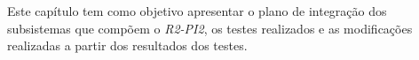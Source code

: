 Este capítulo tem como objetivo apresentar o plano de integração dos subsistemas que compõem o \textit{R2-PI2}, os testes realizados e as modificações realizadas a partir dos resultados dos testes.

